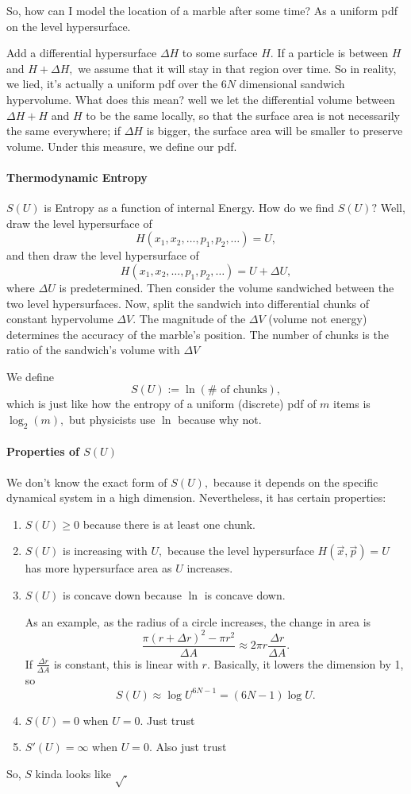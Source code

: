 \documentclass[12pt]{article}
\theoremstyle{remark}
\begin{document}
So, how can I model the location of a marble after some time? As a uniform pdf on the level hypersurface. 

Add a differential hypersurface $\Delta H$ to some surface $H.$ If a particle is between $H$ and $H+\Delta H,$ we assume that it will stay in that region over time. So in reality, we lied, it's actually a uniform pdf over the $6N$ dimensional sandwich hypervolume. What does this mean? well we let the differential volume between $\Delta H+H$ and $H$ to be the same locally, so that the surface area is not necessarily the same everywhere; if $\Delta H$ is bigger, the surface area will be smaller to preserve volume. Under this measure, we define our pdf.

\paragraph{Thermodynamic Entropy}
$S(U)$ is Entropy as a function of internal Energy. How do we find $S(U)?$ Well, draw the level hypersurface of 
\[H(x_1,x_2,\dots,p_1,p_2,\dots)=U,\] and then draw the level hypersurface of
\[H(x_1,x_2,\dots,p_1,p_2,\dots)=U+\Delta U,\] where $\Delta U$ is predetermined.
Then consider the volume sandwiched between the two level hypersurfaces. Now, split the sandwich into differential chunks of constant hypervolume $\Delta V.$ The magnitude of the $\Delta V$ (volume not energy) determines the accuracy of the marble's position. The number of chunks is the ratio of the sandwich's volume with $\Delta V$

We define 
\[S(U):=\ln (\#\text{ of chunks}),\] which is just like how the entropy of a uniform (discrete) pdf of $m$ items is $\log_2(m),$ but physicists use $\ln$ because why not.


\paragraph{Properties of $S(U)$}

We don't know the exact form of $S(U),$ because it depends on the specific dynamical system in a high dimension. Nevertheless, it has certain properties:
\begin{enumerate}
    \item $S(U)\ge 0$ because there is at least one chunk.
    \item $S(U)$ is increasing with $U,$ because the level hypersurface $H(\vec{x},\vec{p})=U$ has more hypersurface area as $U$ increases.
    \item $S(U)$ is concave down because $\ln$ is concave down.

    As an example, as the radius of a circle increases, the change in area is
\[\frac{\pi(r+\Delta r)^2-\pi r^2}{\Delta A}\approx 2\pi r\frac{\Delta r}{\Delta A}.\]
If $\frac{\Delta r}{\Delta A}$ is constant, this is linear with $r.$ Basically, it lowers the dimension by 1, so
\[S(U)\approx \log U^{6N-1}=(6N-1)\log U.\]
    \item $S(U)=0$ when $U=0.$ Just trust
    \item $S'(U)=\infty$ when $U=0.$ Also just trust
\end{enumerate}
So, $S$ kinda looks like $\sqrt.$   
\end{document}
